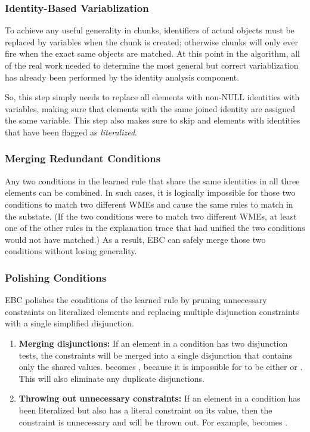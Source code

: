 \subsubsection{Identity-Based Variablization}

To achieve any useful generality in chunks, identifiers of actual objects must be replaced by variables when the chunk is created; otherwise chunks will only ever fire when the exact same objects are matched.  At this point in the algorithm, all of the real work needed to determine the most general but correct variablization has already been performed by the identity analysis component.

So, this step simply needs to replace all elements with non-NULL identities with variables, making sure that elements with the same joined identity are assigned the same variable.  This step also makes sure to skip and elements with identities that have been flagged as \textit{literalized}.

\subsubsection{Merging Redundant Conditions}

Any two conditions in the learned rule that share the same identities in all three elements can be combined.  In such cases, it is logically impossible for those two conditions to match two different WMEs and cause the same rules to match in the substate.  (If the two conditions were to match two different WMEs, at least one of the other rules in the explanation trace that had unified the two conditions would not have matched.)  As a result, EBC can safely merge those two conditions without losing generality.

\subsubsection{Polishing Conditions}

EBC polishes the conditions of the learned rule by pruning unnecessary constraints on literalized elements and replacing multiple disjunction constraints with a single simplified disjunction.

\begin{enumerate}
	\item \textbf{Merging disjunctions:}
	If an element in a condition has two disjunction tests, the constraints will be merged into a single disjunction that contains only the shared values.  becomes , because it is impossible for  to be either  or .  This will also eliminate any duplicate disjunctions.

	\item \textbf{Throwing out unnecessary constraints:}
	If an element in a condition has been literalized but also has a literal constraint on its value, then the constraint is unnecessary and will be thrown out.  For example,   becomes  .
\end{enumerate}

